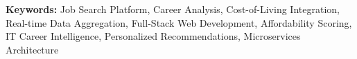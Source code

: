 \documentclass[12pt,a4paper,oneside]{report}
\begin{document}
\vspace{0.5cm}
\noindent\textbf{Keywords:} Job Search Platform, Career Analysis, Cost-of-Living Integration, Real-time Data Aggregation, Full-Stack Web Development, Affordability Scoring, IT Career Intelligence, Personalized Recommendations, Microservices Architecture

\newpage
\thispagestyle{frontmatter}
\tableofcontents

\newpage
\thispagestyle{frontmatter}
\listoffigures

\newpage
\thispagestyle{frontmatter}
\listoftables






\end{document}
